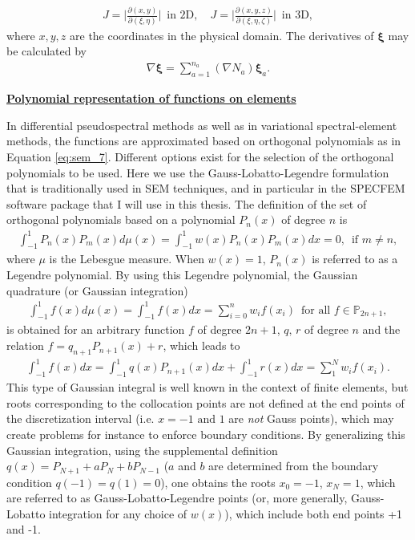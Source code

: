             \begin{align} \label{eq:sem_15}
                J=\biggl| \frac{\partial (x,y)} {\partial(\xi,\eta)}\biggl|\,\,\, \text{in 2D}, \,\,\,\,\,\, J=\biggl|\frac{\partial (x,y,z)}
{\partial(\xi,\eta,\zeta)}\biggr|\,\,\, \text{in 3D},
            \end{align}
            where $x,y,z$ are the coordinates in the physical domain. The derivatives of $\bm{\xi}$ may be calculated by
            \begin{align} \label{eq:sem_16}
                \nabla \bm{\xi} = \sum_{a=1}^{n_a} (\nabla N_a)\bm{\xi}_a.
            \end{align}

\noindent
        \underline{\textbf{Polynomial representation of functions on elements}}

            In differential pseudospectral methods as well as in variational spectral-element methods, the functions are approximated based on orthogonal polynomials as in Equation
\ref{eq:sem_7}. Different options exist for the selection of the orthogonal polynomials to be used. Here we use the Gauss-Lobatto-Legendre formulation that
is traditionally used in SEM techniques, and in particular in the SPECFEM software package that I will use in this thesis.
            The definition of the set of orthogonal polynomials based on a polynomial $P_n(x)$ of degree $n$ is
            \begin{align} \label{eq:sem_17}
                \int_{-1}^1 P_n(x)P_m(x)d\mu(x)=\int_{-1}^1w(x)P_n(x)P_m(x)dx=0,\,\,\, \text{if}\,\, m\neq n,
            \end{align}
            where $\mu$ is the Lebesgue measure. When $w(x)=1$, $P_n(x)$ is referred to as a Legendre polynomial.
            By using this Legendre polynomial, the Gaussian quadrature (or Gaussian integration)
            \begin{align} \label{eq:sem_18}
               \int_{-1}^1 f(x)d\mu(x)=\int_{-1}^1 f(x)dx=\sum_{i=0}^n w_i f(x_i)\,\,\, \text{for all}\,\, f\in \mathbb{P}_{2n+1},
            \end{align}
            is obtained for an arbitrary function $f$ of degree $2n+1$, $q,\,r$ of degree $n$ and the relation $f=q_{n+1}P_{n+1}(x)+r$, which leads to
            \begin{align} \label{eq:sem_19}
               \int_{-1}^1 f(x)dx = \int_{-1}^1 q(x) P_{n+1}(x) dx + \int_{-1}^1 r(x)dx = \sum_1^N w_i f(x_i).
            \end{align}
            This type of Gaussian integral is well known in the context of finite elements,
but roots corresponding to the collocation points are not defined at the end points of the discretization interval
(i.e. $x=-1\text{ and }1$ are \textit{not} Gauss points), which may create problems for instance to enforce boundary conditions.
By generalizing this Gaussian integration, using the supplemental definition $q(x)=P_{N+1}+aP_N+bP_{N-1}$ ($a$ and $b$ are determined
from the boundary condition $q(-1)=q(1)=0$), one obtains the roots $x_0=-1$, $x_N=1$, which are referred to as Gauss-Lobatto-Legendre points
(or, more generally, Gauss-Lobatto integration for any choice of $w(x)$), which include both end points +1 and -1.

